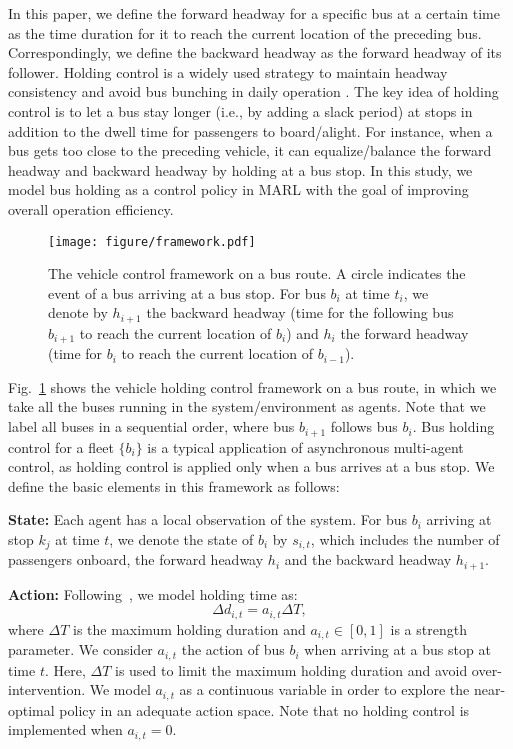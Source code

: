\documentclass{article}
\newcommand{\citeay}[1]{\citeauthor{#1}\,\shortcite{#1}}
\begin{document}
In this paper, we define the forward headway for a specific bus at a certain time as the time duration for it to reach the current location of the preceding bus. Correspondingly, we define the backward headway as the forward headway of its follower. Holding control is a widely used strategy to maintain headway consistency and avoid bus bunching in daily operation \cite{wang2020dynamic}. The key idea of holding control is to let a bus stay longer (i.e., by adding a slack period) at stops in addition to the dwell time for passengers to board/alight. For instance, when a bus gets too close to the preceding vehicle, it can equalize/balance the forward headway and backward headway by holding at a bus stop. In this study, we model bus holding as a control policy in MARL with the goal of improving overall operation efficiency.

\begin{figure}[!t]
\centering
     \texttt{[image: figure/framework.pdf]}
  \caption{The vehicle control framework on a bus route. A circle indicates the event of a bus arriving at a bus stop. For bus $b_i$ at time $t_i$, we denote by $h_{i+1}$ the backward headway (time for the following bus $b_{i+1}$ to reach the current location of $b_i$) and $h_{i}$ the forward headway (time for $b_i$ to reach the current location of $b_{i-1}$).}
   \label{fig:framework}
\end{figure}




Fig.~\ref{fig:framework} shows the vehicle holding control framework on a bus route, in which we take all the buses running in the system/environment as agents. Note that we label all buses in a sequential order, where bus $b_{i+1}$ follows bus $b_i$. Bus holding control for a fleet $\{b_i\}$ is a typical application of asynchronous multi-agent control, as holding control is applied only when a bus arrives at a bus stop. We define the basic elements in this framework as follows:


\noindent\textbf{State:} Each agent has a local observation of the system. For bus $b_i$ arriving at stop $k_j$ at time $t$, we denote the state of $b_i$ by $s_{i,t}$, which includes the number of passengers onboard, the forward headway $h_i$ and the backward headway $h_{i+1}$.

\noindent\textbf{Action:} Following \citeay{wang2020dynamic}, we model holding time as:
\begin{equation}
\Delta d_{i,t}=a_{i,t} \Delta T,
\label{eq:action}
\end{equation}
where $\Delta T$ is the maximum holding duration and $a_{i,t} \in \left[0,1\right]$ is a strength parameter. We consider $a_{i,t}$ the action of bus $b_i$ when arriving at a bus stop at time $t$. Here, $\Delta T$ is used to limit the maximum holding duration and avoid over-intervention. We model $a_{i,t}$ as a continuous variable in order to explore the near-optimal policy in an adequate action space. Note that no holding control is implemented when $a_{i,t}=0$.
\end{document}
